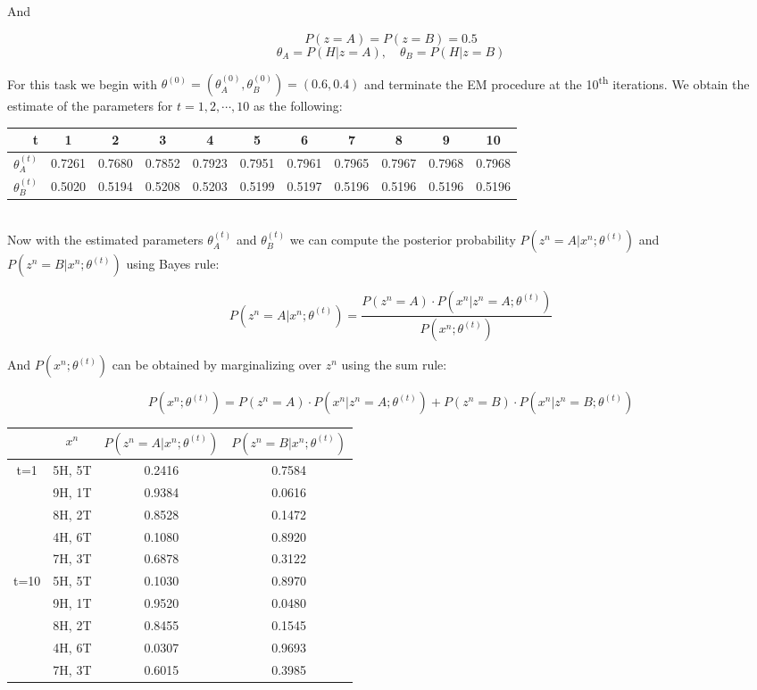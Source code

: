 \documentclass[a4paper]{article}
\begin{document}
And

$$ P(z = A) = P(z = B) = 0.5 $$
$$ \theta_A = P(H|z=A), \quad \theta_B = P(H|z=B)  $$

For this task we begin with $\theta^{(0)} = (\theta^{(0)}_A, \theta^{(0)}_B) = (0.6, 0.4)$ and terminate the EM procedure at the 10\textsuperscript{th} iterations. We obtain the estimate of the parameters for $t = 1,2,\cdots,10$ as the following: \\

\begin{tabular}{ | r | c c c c c c c c c c | }
	\hline
	t & 1 & 2 & 3 & 4 & 5 & 6 & 7 & 8 & 9 & 10 \\ \hline
	$\theta_A^{(t)}$ & 0.7261  &  0.7680  &  0.7852  &  0.7923  &  0.7951  &  0.7961  &  0.7965  &  0.7967  &  0.7968  &  0.7968 \\
	$\theta_B^{(t)}$ & 0.5020  &  0.5194  &  0.5208  &  0.5203  &  0.5199  &  0.5197  &  0.5196  &  0.5196  &  0.5196  &  0.5196 \\ \hline
\end{tabular}

~\\

Now with the estimated parameters $\theta_A^{(t)}$ and $\theta_B^{(t)}$ we can compute the posterior probability $P(z^n = A|x^n; \theta^{(t)})$ and $P(z^n = B|x^n; \theta^{(t)})$ using Bayes rule:

\begin{equation}
	P(z^n = A|x^n; \theta^{(t)}) = \frac{P(z^n = A) \cdot P(x^n|z^n = A; \theta^{(t)})}{P(x^n; \theta^{(t)})}
\end{equation}

And $P(x^n; \theta^{(t)})$ can be obtained by marginalizing over $z^n$ using the sum rule: 

\begin{equation}
	P(x^n; \theta^{(t)}) = P(z^n = A) \cdot P(x^n|z^n = A; \theta^{(t)}) + P(z^n = B) \cdot P(x^n|z^n = B; \theta^{(t)})
\end{equation}

\begin{center}
\begin{tabular}{ | c | c | c | c | }
	\hline
	& $x^n$ & $P(z^n=A|x^n; \theta^{(t)})$ & $P(z^n=B|x^n; \theta^{(t)})$ \\ \hline
	\multirow{5}{*}{t=1} & 5H, 5T & 0.2416 & 0.7584 \\
		& 9H, 1T & 0.9384 & 0.0616 \\
		& 8H, 2T & 0.8528 & 0.1472 \\
		& 4H, 6T & 0.1080 & 0.8920 \\
		& 7H, 3T & 0.6878 & 0.3122 \\ \hline
    \multirow{5}{*}{t=10} & 5H, 5T & 0.1030 & 0.8970 \\
    	& 9H, 1T & 0.9520 & 0.0480 \\
    	& 8H, 2T & 0.8455 & 0.1545 \\
    	& 4H, 6T & 0.0307 & 0.9693 \\
    	& 7H, 3T & 0.6015 & 0.3985 \\ \hline
\end{tabular}
\end{center}
\end{document}
